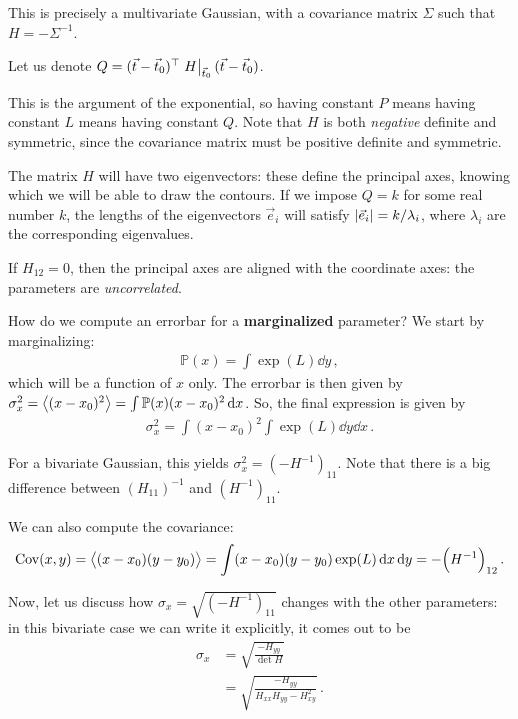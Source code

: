 \documentclass[main.tex]{subfiles}
\begin{document}
This is precisely a multivariate Gaussian, with a covariance matrix \(\Sigma \) such that \(H = - \Sigma^{-1}\).

Let us denote \(Q = (\vec{t} - \vec{t}_0)^{\top} \eval{H}_{\vec{t}_0 } (\vec{t} - \vec{t}_0)\). 

This is the argument of the exponential, so having constant \(P\) means having constant \(L\) means having constant \(Q\). 
Note that \(H\) is both \emph{negative} definite and symmetric, since the covariance matrix must be positive definite and symmetric. 

The matrix \(H\) will have two eigenvectors: these define the principal axes, knowing which we will be able to draw the contours.
If we impose \(Q = k\) for some real number \(k\), the lengths of the eigenvectors \( \vec{e}_i\) will satisfy \(\abs{\vec{e}_i} = k / \lambda _i\), where \(\lambda _i\) are the corresponding eigenvalues.

If \(H_{12} = 0\), then the principal axes are aligned with the coordinate axes: the parameters are \emph{uncorrelated}.

How do we compute an errorbar for a \textbf{marginalized} parameter? 
We start by marginalizing: 
%
\begin{align}
\mathbb{P}(x) = \int \exp(L) \dd{y}
\,,
\end{align}
%
which will be a function of \(x\) only. 
The errorbar is then given by \(\sigma _x^2 = \expval{(x - x_0 )^2} = \int \mathbb{P}(x) (x-x_0 )^2 \dd{x}\). So, the final expression is given by 
%
\begin{align}
\sigma^2_x = \int (x-x_0)^2 \int \exp(L) \dd{y} \dd{x}
\,.
\end{align}

For a bivariate Gaussian, this yields \(\sigma^2_x = (-H^{-1})_{11}\). 
Note that there is a big difference between \((H_{11})^{-1}\) and \((H^{-1})_{11}\).

We can also compute the covariance: 
%
\begin{align}
\operatorname{Cov}(x, y) = \expval{(x-x_0 )(y-y_0 )}
= \int (x-x_0 ) (y - y_0 ) \exp(L) \dd{x} \dd{y}  = - \qty(H^{-1})_{12}
\,.
\end{align}

Now, let us discuss how \(\sigma _x = \sqrt{(- H^{-1})_{11}}\) changes with the other parameters: in this bivariate case we can write it explicitly, it comes out to be
%
\begin{align}
\sigma _x &= \sqrt{\frac{- H_{yy}}{\det H}}  \\
&= \sqrt{\frac{- H_{yy}}{H_{xx} H_{yy} - H^2_{xy}}}
\,.
\end{align}
\end{document}
